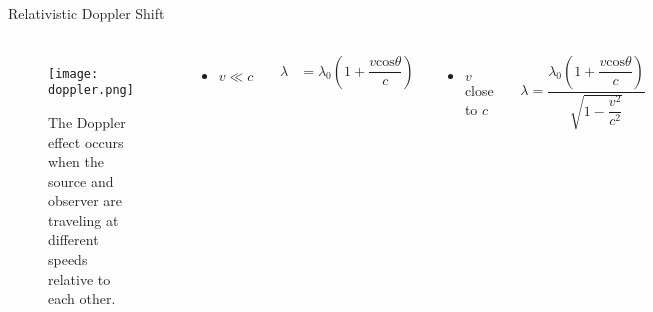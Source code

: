 \documentclass{beamer}
\begin{document}
\begin{frame}{Relativistic Doppler Shift}
       \begin{columns}
            \begin{figure}
                \centering
                \texttt{[image: doppler.png]}
                \caption{The Doppler effect occurs when the source and observer are traveling at different speeds relative to each other. }
                \label{emission_lines}
            \end{figure}
          \begin{itemize}
              \item $v \ll c$
          \end{itemize}
          \begin{align*}
              \lambda &= \lambda_0(1+\dfrac{v\mathrm{cos}\theta}{c})
          \end{align*}
          
          \pause 
          
          \begin{itemize}
              \item $v$ close to $c$
          \end{itemize}
          \begin{align*}
              \lambda = \dfrac{\lambda_0(1+\dfrac{v\mathrm{cos}\theta}{c})}{\sqrt{1-\dfrac{v^2}{c^2}}}
          \end{align*}
          \end{columns} 
\end{frame}
\end{document}
